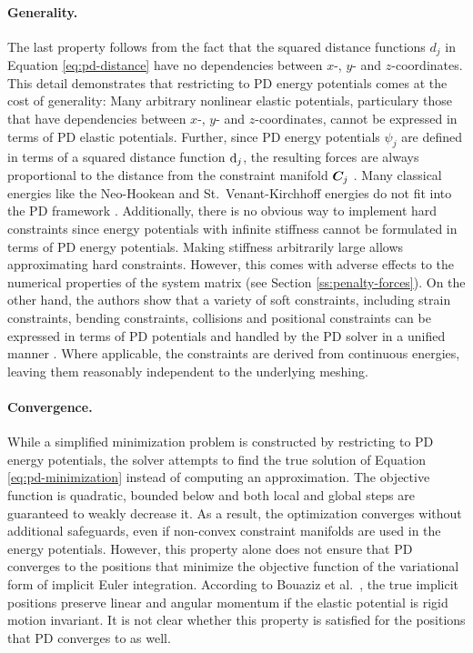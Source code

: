 \paragraph{Generality.}
The last property follows from the fact that the squared distance functions $d_j$ in Equation \ref{eq:pd-distance} have no dependencies between 
$x$-, $y$- and $z$-coordinates. This detail demonstrates that restricting to PD energy potentials comes at the cost of generality: 
Many arbitrary nonlinear elastic potentials, particulary those that have dependencies between $x$-, $y$- and $z$-coordinates, cannot be expressed 
in terms of PD elastic potentials. Further, since PD energy potentials $\psi_j$ are defined in terms of a squared distance function $\mathrm{d}_j$, the 
resulting forces are always proportional to the distance from the constraint manifold $\bm{C}_j$ \cite{overby2017}. Many classical energies 
like the Neo-Hookean and St.\ Venant-Kirchhoff energies do not fit into the PD framework \cite{liu2017}. Additionally, there is no obvious way to 
implement hard constraints since energy potentials with infinite stiffness cannot be formulated in terms of PD energy potentials. Making stiffness arbitrarily 
large allows approximating hard constraints. However, this comes with adverse effects to the numerical properties of the system matrix (see 
Section \ref{ss:penalty-forces}). On the other hand, the authors show that a variety of soft constraints, including strain constraints, bending constraints, 
collisions and positional constraints can be expressed in terms of PD potentials and handled by the PD solver in a unified manner \cite{bouaziz2014}. 
Where applicable, the constraints are derived from continuous energies, leaving them reasonably independent to the underlying meshing.

\paragraph{Convergence.}
While a simplified minimization problem is constructed by restricting to PD energy potentials, the solver attempts to find the 
true solution of Equation \ref{eq:pd-minimization} instead of computing an approximation. The objective function is quadratic, bounded below 
and both local and global steps are guaranteed to weakly decrease it. As a result, the optimization converges without additional 
safeguards, even if non-convex constraint manifolds are used in the energy potentials. However, this property alone does not ensure that 
PD converges to the positions that minimize the objective function of the variational form of implicit Euler integration. 
According to Bouaziz et al.\ \cite{bouaziz2014}, the true implicit positions preserve linear and angular momentum if the elastic potential 
is rigid motion invariant. It is not clear whether this property is satisfied for the positions that PD converges to as well.

